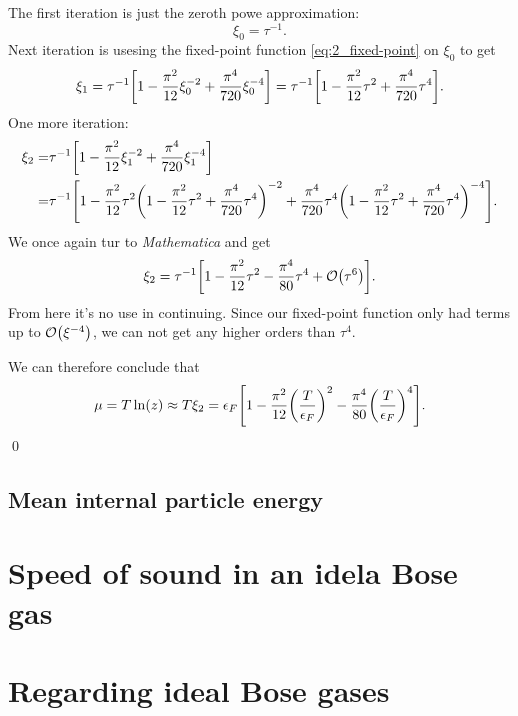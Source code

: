 \documentclass[11pt,letter, swedish, english
]{article}
\renewcommand{\thesubsection}{\arabic{section} (\alph{subsection})}
\begin{document}
The first iteration is just the zeroth powe approximation:
\begin{equation}
\xi_0=\tau^{-1}.
\end{equation}
Next iteration is usesing the fixed-point function
\eqref{eq:2_fixed-point} on $\xi_0$ to get
\begin{equation}
\xi_1=\tau^{-1}\qty[1 - \frac{\pi^2}{12}\xi_0^{-2}
 + \frac{\pi^4}{720}\xi_0^{-4} ]
=\tau^{-1}\qty[1 - \frac{\pi^2}{12}\tau^{2}
 + \frac{\pi^4}{720}\tau^{4} ].
\end{equation}
One more iteration:
\begin{equation}
\begin{aligned}
\xi_2=&\tau^{-1}\qty[1 - \frac{\pi^2}{12}\xi_1^{-2}
 + \frac{\pi^4}{720}\xi_1^{-4} ]\\
=& \tau^{-1}\qty[1 
 - \frac{\pi^2}{12}\tau^{2}
\qty(1 - \frac{\pi^2}{12}\tau^{2}
 + \frac{\pi^4}{720}\tau^{4})^{-2}
 + \frac{\pi^4}{720}\tau^{4} 
\qty(1 - \frac{\pi^2}{12}\tau^{2}
 + \frac{\pi^4}{720}\tau^{4})^{-4}
].
\end{aligned}
\end{equation}
We once again tur to \emph{Mathematica} and get
\begin{equation}
\xi_2=\tau^{-1}\qty[1 - \frac{\pi^2}{12}\tau^{2}
 - \frac{\pi^4}{80}\tau^{4} + \order{\tau^6}].
\end{equation}
From here it's no use in continuing. Since our fixed-point function
only had terms up to $\order{\xi^{-4}}$, we can not get any higher
orders than $\tau^4$.

We can therefore conclude that
\begin{equation}\label{eq:2_mu}
\mu=T\ln(z)\approx T\xi_2= \epsilon_F \qty[1
-\frac{\pi^2}{12}\qty(\frac{T}{\epsilon_F})^2
-\frac{\pi^4}{80}\qty(\frac{T}{\epsilon_F})^4].
\end{equation}
\qed

\subsection{Mean internal particle energy}



\section{Speed of sound in an idela Bose gas}
\renewcommand{\thesubsection}{\arabic{section} (\alph{subsection})}


\section{Regarding ideal Bose gases }
\end{document}
